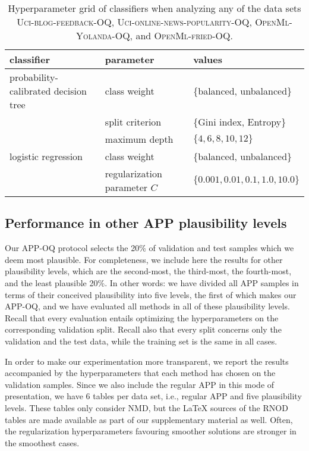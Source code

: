 \documentclass[10pt,a4paper]{article}
\begin{document}
\begin{table}
  \centering
  \caption{Hyperparameter grid of classifiers when analyzing any of
  the data sets \textsc{Uci-blog-feedback-OQ},
  \textsc{Uci-online-news-popularity-OQ}, \textsc{OpenMl-Yolanda-OQ},
  and \textsc{OpenMl-fried-OQ}.}
  \label{tab:hyperparameter-others}
  \footnotesize
  \begin{tabular}{lll}
    \toprule
    classifier & parameter & values \\
    \midrule
    probability-calibrated decision tree & class weight & \{balanced, unbalanced\} \\
               & split criterion & \{Gini index, Entropy\} \\
               & maximum depth & $\{4, 6, 8, 10, 12\}$ \\
    logistic regression & class weight & \{balanced, unbalanced\} \\
               & regularization parameter $C$ & $\{0.001, 0.01, 0.1, 1.0, 10.0\}$ \\
    \bottomrule
  \end{tabular}
\end{table}


\subsection{Performance in other APP plausibility levels}

\noindent Our APP-OQ protocol selects the 20\% of validation and test
samples which we deem most plausible. For completeness, we include
here the results for other plausibility levels, which are the
second-most, the third-most, the fourth-most, and the least plausible
20\%. In other words: we have divided all APP samples in terms of
their conceived plausibility into five levels, the first of which
makes our APP-OQ, and we have evaluated all methods in all of these
plausibility levels. Recall that every evaluation entails optimizing
the hyperparameters on the corresponding validation split. Recall also
that every split concerns only the validation and the test data, while
the training set is the same in all cases.

In order to make our experimentation more transparent, we report the
results accompanied by the hyperparameters that each method has
chosen on the validation samples. Since we also include the regular
APP in this mode of presentation, we have 6 tables per data set, i.e.,
regular APP and five plausibility levels. These tables only consider
NMD, but the LaTeX sources of the RNOD tables are made available as
part of our supplementary material as well.  Often, the regularization
hyperparameters favouring smoother solutions are stronger in the
smoothest cases.
\end{document}
